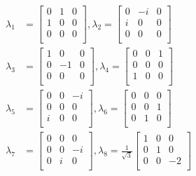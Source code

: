 \documentclass[10pt,letterpaper]{article}
\newcommand{\0}{\mathcal{O}}
\begin{document}
\begin{multicols}{3}
\begin{align*}
    \lambda_1 &= \begin{bmatrix}
        0 & 1 & 0 \\
        1 & 0 & 0 \\
        0 & 0 & 0 \\
    \end{bmatrix}, \lambda_2 = \begin{bmatrix}
        0 & -i & 0 \\
        i & 0 & 0 \\
        0 & 0 & 0 \\
    \end{bmatrix}\\
    \lambda_3 &= \begin{bmatrix}
        1 & 0 & 0 \\
        0 & -1 & 0 \\
        0 & 0 & 0 \\
    \end{bmatrix}, \lambda_4 = \begin{bmatrix}
        0 & 0 & 1 \\
        0 & 0 & 0 \\
        1 & 0 & 0 \\
    \end{bmatrix} \\
    \lambda_5 &= \begin{bmatrix}
        0 & 0 & -i \\
        0 & 0 & 0 \\
        i & 0 & 0 \\
    \end{bmatrix}, \lambda_6 = \begin{bmatrix}
        0 & 0 & 0 \\
        0 & 0 & 1 \\
        0 & 1 & 0 \\
    \end{bmatrix} \\
    \lambda_7 &= \begin{bmatrix}
        0 & 0 & 0 \\
        0 & 0 & -i \\
        0 & i & 0 \\
    \end{bmatrix}, \lambda_8 = \frac{1}{\sqrt{3}}\begin{bmatrix}
        1 & 0 & 0 \\
        0 & 1 & 0 \\
        0 & 0 & -2 \\
    \end{bmatrix} \\
\end{align*}


\end{multicols}
\end{document}
